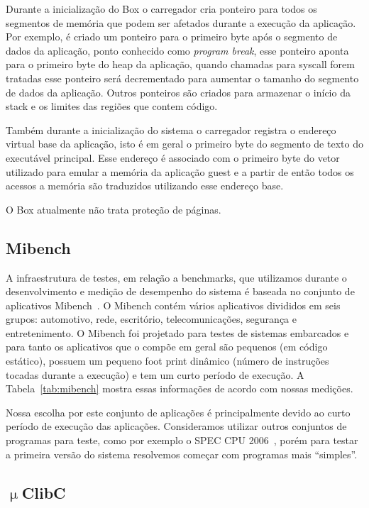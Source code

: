 \documentclass[11pt,twoside]{article}
\begin{document}
Durante a inicialização do Box o carregador cria ponteiro para todos os
segmentos de memória que podem ser afetados durante a execução da aplicação.
Por exemplo, é criado um ponteiro para o primeiro byte após o segmento de
dados da aplicação, ponto conhecido como \textit{program break}, esse 
ponteiro aponta para o primeiro byte do heap da aplicação, quando chamadas
para syscall forem tratadas esse ponteiro será decrementado para aumentar
o tamanho do segmento de dados da aplicação. Outros ponteiros são criados
para armazenar o início da stack e os limites das regiões que contem código.

Também durante a inicialização do sistema o carregador registra o endereço
virtual base da aplicação, isto é em geral o primeiro byte do segmento de
texto do executável principal. Esse endereço é associado com o primeiro
byte do vetor utilizado para emular a memória da aplicação guest e a partir
de então todos os acessos a memória são traduzidos utilizando esse endereço
base.

O Box atualmente não trata proteção de páginas.

\subsection{Mibench}

A infraestrutura de testes, em relação a benchmarks, que utilizamos durante
o desenvolvimento e medição de desempenho do sistema é baseada no conjunto
de aplicativos Mibench~\cite{mibench}. O Mibench contém vários aplicativos
divididos em seis grupos: automotivo, rede, escritório, telecomunicações,
segurança e entretenimento. O Mibench foi projetado para testes de sistemas
embarcados e para tanto os aplicativos que o compõe em geral são pequenos 
(em código estático), possuem um pequeno foot print dinâmico (número de
instruções tocadas durante a execução) e tem um curto período de execução.
A Tabela~\ref{tab:mibench} mostra essas informações de acordo com nossas
medições.

Nossa escolha por este conjunto de aplicações é principalmente devido ao
curto período de execução das aplicações. Consideramos utilizar outros
conjuntos de programas para teste, como por exemplo o SPEC CPU 2006~\cite{spec2006},
porém para testar a primeira versão do sistema resolvemos começar com
programas mais ``simples''.




\subsection{$\upmu$ClibC}
\end{document}
